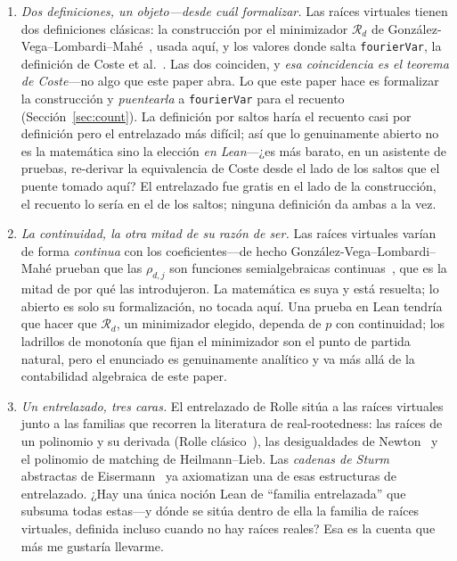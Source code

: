 \documentclass[11pt]{article}
\newcommand{\lean}[1]{\texttt{#1}}
\newcommand{\Rd}{\mathcal{R}}
\begin{document}
\begin{enumerate}\itemsep3pt
\item \emph{Dos definiciones, un objeto---desde cu\'al formalizar.} Las ra\'ices virtuales tienen dos
definiciones cl\'asicas: la construcci\'on por el minimizador $\Rd_d$ de
Gonz\'alez-Vega--Lombardi--Mah\'e~\cite{glm}, usada aqu\'i, y los valores donde salta \lean{fourierVar},
la definici\'on de Coste et al.~\cite{coste}. Las dos coinciden, y \emph{esa coincidencia es el teorema
de Coste}---no algo que este paper abra. Lo que este paper hace es formalizar la construcci\'on y
\emph{puentearla} a \lean{fourierVar} para el recuento (Secci\'on~\ref{sec:count}). La definici\'on por
saltos har\'ia el recuento casi por definici\'on pero el entrelazado m\'as dif\'icil; as\'i que lo
genuinamente abierto no es la matem\'atica sino la elecci\'on \emph{en Lean}---¿es m\'as barato, en un
asistente de pruebas, re-derivar la equivalencia de Coste desde el lado de los saltos que el puente
tomado aqu\'i? El entrelazado fue gratis en el lado de la construcci\'on, el recuento lo ser\'ia en el
de los saltos; ninguna definici\'on da ambas a la vez.
\item \emph{La continuidad, la otra mitad de su raz\'on de ser.} Las ra\'ices virtuales var\'ian de
forma \emph{continua} con los coeficientes---de hecho Gonz\'alez-Vega--Lombardi--Mah\'e prueban que las
$\rho_{d,j}$ son funciones semialgebraicas continuas~\cite{glm}, que es la mitad de por qu\'e las
introdujeron. La matem\'atica es suya y est\'a resuelta; lo abierto es solo su formalizaci\'on, no
tocada aqu\'i. Una prueba en Lean tendr\'ia que hacer que $\Rd_d$, un minimizador elegido, dependa de
$p$ con continuidad; los ladrillos de monoton\'ia que fijan el minimizador son el punto de partida
natural, pero el enunciado es genuinamente anal\'itico y va m\'as all\'a de la contabilidad algebraica
de este paper.
\item \emph{Un entrelazado, tres caras.} El entrelazado de Rolle sit\'ua a las ra\'ices virtuales junto
a las familias que recorren la literatura de real-rootedness: las ra\'ices de un polinomio y su derivada
(Rolle cl\'asico~\cite{rolle}), las desigualdades de Newton~\cite{newton} y el polinomio de matching de
Heilmann--Lieb. Las \emph{cadenas de Sturm} abstractas de Eisermann~\cite{eisermann} ya axiomatizan una
de esas estructuras de entrelazado. ¿Hay una \'unica noci\'on Lean de ``familia entrelazada'' que
subsuma todas estas---y d\'onde se sit\'ua dentro de ella la familia de ra\'ices virtuales, definida
incluso cuando no hay ra\'ices reales? Esa es la cuenta que m\'as me gustar\'ia llevarme.
\end{enumerate}
\end{document}
